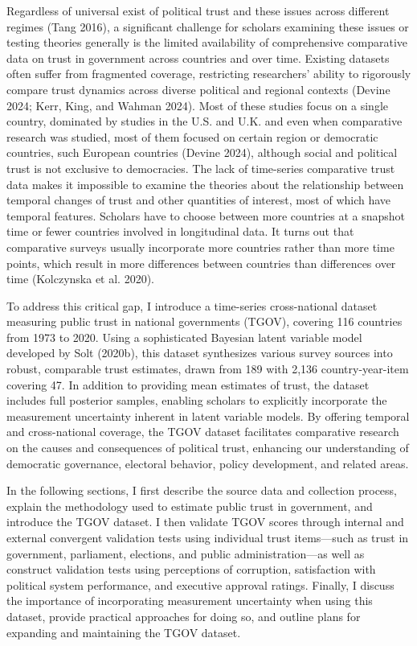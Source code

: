 \documentclass[
  12pt,
]{article}
\begin{document}
Regardless of universal exist of political trust and these issues across different regimes (Tang 2016), a significant challenge for scholars examining these issues or testing theories generally is the limited availability of comprehensive comparative data on trust in government across countries and over time.
Existing datasets often suffer from fragmented coverage, restricting researchers' ability to rigorously compare trust dynamics across diverse political and regional contexts (Devine 2024; Kerr, King, and Wahman 2024).
Most of these studies focus on a single country, dominated by studies in the U.S. and U.K. and even when comparative research was studied, most of them focused on certain region or democratic countries, such European countries (Devine 2024), although social and political trust is not exclusive to democracies.
The lack of time-series comparative trust data makes it impossible to examine the theories about the relationship between temporal changes of trust and other quantities of interest, most of which have temporal features. Scholars have to choose between more countries at a snapshot time or fewer countries involved in longitudinal data.
It turns out that comparative surveys usually incorporate more countries rather than more time points, which result in more differences between countries than differences over time (Kolczynska et al. 2020).

To address this critical gap, I introduce a time-series cross-national dataset measuring public trust in national governments (TGOV), covering 116 countries from 1973 to 2020.
Using a sophisticated Bayesian latent variable model developed by Solt (2020b), this dataset synthesizes various survey sources into robust, comparable trust estimates, drawn from 189 with 2,136 country-year-item covering 47.
In addition to providing mean estimates of trust, the dataset includes full posterior samples, enabling scholars to explicitly incorporate the measurement uncertainty inherent in latent variable models.
By offering temporal and cross-national coverage, the TGOV dataset facilitates comparative research on the causes and consequences of political trust, enhancing our understanding of democratic governance, electoral behavior, policy development, and related areas.

In the following sections, I first describe the source data and collection process, explain the methodology used to estimate public trust in government, and introduce the TGOV dataset.
I then validate TGOV scores through internal and external convergent validation tests using individual trust items---such as trust in government, parliament, elections, and public administration---as well as construct validation tests using perceptions of corruption, satisfaction with political system performance, and executive approval ratings.
Finally, I discuss the importance of incorporating measurement uncertainty when using this dataset, provide practical approaches for doing so, and outline plans for expanding and maintaining the TGOV dataset.
\end{document}
